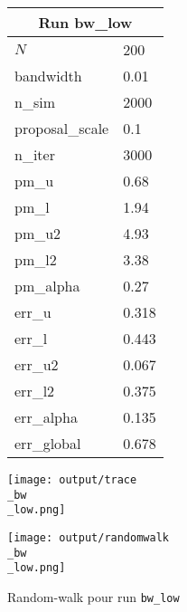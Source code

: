 
\begin{figure}[H]
  \centering
  \begin{minipage}[t]{0.45\textwidth}
    \vspace{0pt}
    \footnotesize
    \begin{tabular}{|l|l|}\hline
    \multicolumn{2}{|c|}{\textbf{Run bw\_low}} \\ \hline
    $N$ & 200 \\ \hline
    bandwidth & 0.01 \\ \hline
    n\_sim & 2000 \\ \hline
    proposal\_scale & 0.1 \\ \hline
    n\_iter & 3000 \\ \hline
    pm\_u & 0.68 \\ \hline
    pm\_l & 1.94 \\ \hline
    pm\_u2 & 4.93 \\ \hline
    pm\_l2 & 3.38 \\ \hline
    pm\_alpha & 0.27 \\ \hline
    err\_u & 0.318 \\ \hline
    err\_l & 0.443 \\ \hline
    err\_u2 & 0.067 \\ \hline
    err\_l2 & 0.375 \\ \hline
    err\_alpha & 0.135 \\ \hline
    err\_global & 0.678 \\ \hline
    \end{tabular}
  \end{minipage}
  \hfill
  \begin{minipage}[t]{0.45\textwidth}
    \vspace{0pt}
    \texttt{[image: output/trace\\\_bw\\\_low.png]}
  \end{minipage}
\end{figure}

\begin{figure}[H]
  \centering
  \texttt{[image: output/randomwalk\\\_bw\\\_low.png]}
  \caption{Random-walk pour run \texttt{bw\_low}}
\end{figure}


